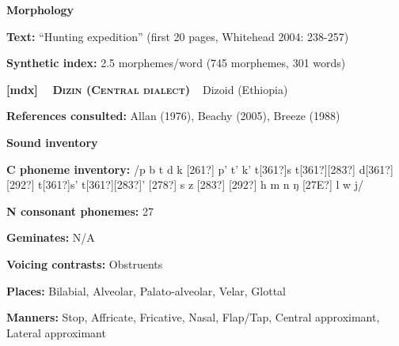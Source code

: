 \begin{styleBody}
\textbf{Morphology}
\end{styleBody}

\begin{styleBody}
\textbf{Text: }“Hunting expedition” (first 20 pages, Whitehead 2004: 238-257)
\end{styleBody}

\begin{styleBody}
\textbf{Synthetic index: }2.5 morphemes/word (745 morphemes, 301 words)
\end{styleBody}

\clearpage\begin{styleBody}
\textbf{[mdx] }\ \ \textbf{\textsc{Dizin (Central dialect)}}\textbf{\ \ }Dizoid (Ethiopia)
\end{styleBody}

\begin{styleBody}
\textbf{References consulted: }Allan (1976), Beachy (2005), Breeze (1988)
\end{styleBody}

\begin{styleBody}
\textbf{Sound inventory}
\end{styleBody}

\begin{styleBody}
\textbf{C phoneme inventory:} /p b t d k [261?] p’ t’ k’ t[361?]s t[361?][283?] d[361?][292?] t[361?]s’ t[361?][283?]’ [278?] s z [283?] [292?] h m n ŋ [27E?] l w j/
\end{styleBody}

\begin{styleBody}
\textbf{N consonant phonemes:} 27
\end{styleBody}

\begin{styleBody}
\textbf{Geminates:} N/A
\end{styleBody}

\begin{styleBody}
\textbf{Voicing contrasts:} Obstruents
\end{styleBody}

\begin{styleBody}
\textbf{Places:} Bilabial, Alveolar, Palato-alveolar, Velar, Glottal
\end{styleBody}

\begin{styleBody}
\textbf{Manners:} Stop, Affricate, Fricative, Nasal, Flap/Tap, Central approximant, Lateral approximant
\end{styleBody}

